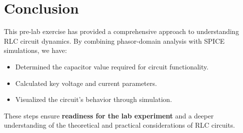 \chapter{Conclusion}

This pre-lab exercise has provided a comprehensive approach to understanding RLC circuit dynamics. By combining phasor-domain analysis with SPICE simulations, we have:

\begin{itemize}
    \item Determined the capacitor value  required for circuit functionality.
    \item Calculated key voltage and current parameters.
    \item Visualized the circuit’s behavior through simulation.
\end{itemize}

These steps ensure \textbf{readiness for the lab experiment} and a deeper understanding of the theoretical and practical considerations of RLC circuits. 

